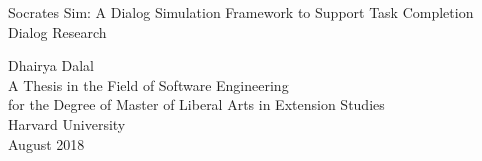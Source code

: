 
\thispagestyle{empty}
\begin{center}

  \vspace*{0.6in}
  Socrates Sim: A Dialog Simulation Framework to Support Task Completion Dialog Research
  
  \vspace{2.3in}
  Dhairya Dalal\\
  \vspace{1.8in}
  A Thesis in the Field of Software Engineering\\
  for the Degree of Master of Liberal Arts in Extension Studies\\
  \vspace{.8in}
  Harvard University\\

  \vfill
  August 2018
  \vspace*{.5in}
\end{center}




